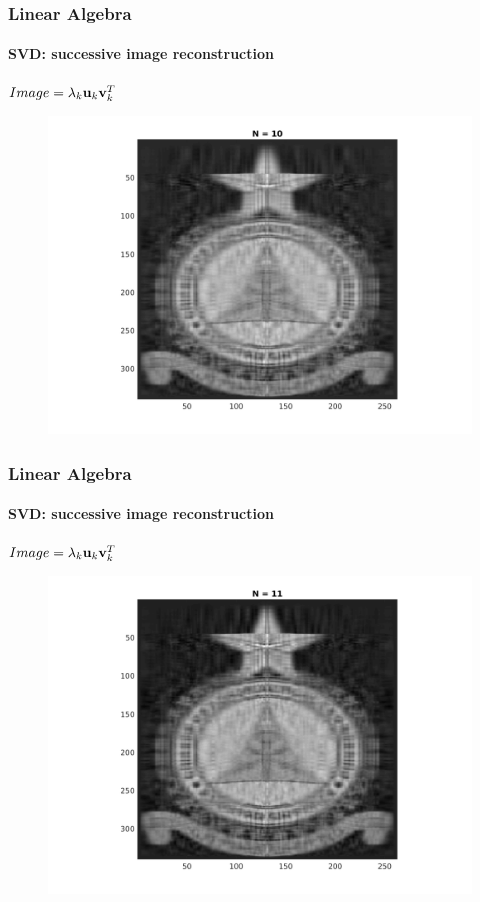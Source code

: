 \documentclass[hyperref={pdfpagelabels=true}]{beamer}
\begin{document}
\begin{frame}
\frametitle{Linear Algebra}
\framesubtitle{SVD: successive image reconstruction} 
\small{
\begin{center}
$Image = \lambda_k{\bf u}_k {\bf v}_k^T$
\end{center}}
\begin{figure}[!htb]
\centering
\includegraphics [scale=0.48]{n/b10.png}
\end{figure}
\end{frame}


\begin{frame}
\frametitle{Linear Algebra}
\framesubtitle{SVD: successive image reconstruction} 
\small{
\begin{center}
$Image = \lambda_k{\bf u}_k {\bf v}_k^T$
\end{center}}
\begin{figure}[!htb]
\centering
\includegraphics [scale=0.48]{n/b11.png}
\end{figure}
\end{frame}
\end{document}
